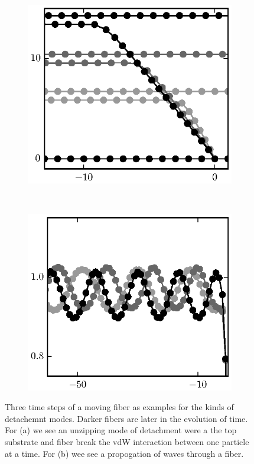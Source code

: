 	\begin{figure}[t]
		\centering
		\begin{subfigure}{.5\textwidth}
			\centering
			\includegraphics{./fig/ch3/pull/unzip_anim.eps}
			\caption{\label{subfig:unzip}}
		\end{subfigure}%
		~
		\begin{subfigure}{.5\textwidth}
			\centering
			\includegraphics{./fig/ch3/pull/wave_anim.eps}
			\caption{\label{subfig:travel_waves}}
		\end{subfigure}
		\caption{Three time steps of a moving fiber as examples for the kinds of detachemnt modes. Darker fibers are later in the evolution of time. For (a) we see an unzipping mode of detachment were a the top substrate and fiber break the vdW interaction between one particle at a time. For (b) wee see a propogation of waves through a fiber.\label{fig:animation}}	
	\end{figure}


